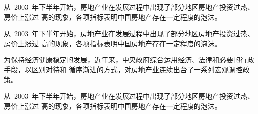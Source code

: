 \documentclass[cap,cs5size,winfonts,nospace,indent,fancyhdr]{ctexart}
\begin{document}
从~2003~年下半年开始，房地产业在发展过程中出现了部分地区房地产投资过热、房价上涨过
高的现象，各项指标表明中国房地产存在一定程度的泡沫。

\begin{adjustwidth}{2cm}{2cm}
\qquad 从~2003~年下半年开始，房地产业在发展过程中出现了部分地区房地产投资过热、房价上涨过
高的现象，各项指标表明中国房地产存在一定程度的泡沫。

为保持经济健康稳定的发展，近年来，中央政府综合运用经济、法律和必要的行政手段，以区别对待和
循序渐进的方式，对房地产业连续出台了一系列宏观调控政策。
\end{adjustwidth}

从~2003~年下半年开始，房地产业在发展过程中出现了部分地区房地产投资过热、房价上涨过
高的现象，各项指标表明中国房地产存在一定程度的泡沫。
\end{document}

